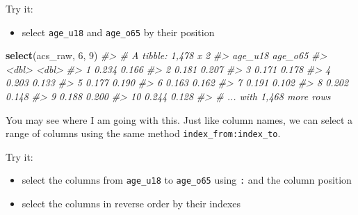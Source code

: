 \documentclass[
]{book}
\newenvironment{Shaded}{\begin{snugshade}}{\end{snugshade}}
\newcommand{\CommentTok}[1]{\textcolor[rgb]{0.56,0.35,0.01}{\textit{#1}}}
\newcommand{\DecValTok}[1]{\textcolor[rgb]{0.00,0.00,0.81}{#1}}
\newcommand{\KeywordTok}[1]{\textcolor[rgb]{0.13,0.29,0.53}{\textbf{#1}}}
\newcommand{\NormalTok}[1]{#1}
\providecommand{\tightlist}{%
  \setlength{\itemsep}{0pt}\setlength{\parskip}{0pt}}
\begin{document}
Try it:

\begin{itemize}
\tightlist
\item
  select \texttt{age\_u18} and \texttt{age\_o65} by their position
\end{itemize}

\begin{Shaded}
\begin{Highlighting}[]
\KeywordTok{select}\NormalTok{(acs\_raw, }\DecValTok{6}\NormalTok{, }\DecValTok{9}\NormalTok{)}
\CommentTok{\#\textgreater{} \# A tibble: 1,478 x 2}
\CommentTok{\#\textgreater{}    age\_u18 age\_o65}
\CommentTok{\#\textgreater{}      \textless{}dbl\textgreater{}   \textless{}dbl\textgreater{}}
\CommentTok{\#\textgreater{}  1   0.234   0.166}
\CommentTok{\#\textgreater{}  2   0.181   0.207}
\CommentTok{\#\textgreater{}  3   0.171   0.178}
\CommentTok{\#\textgreater{}  4   0.203   0.133}
\CommentTok{\#\textgreater{}  5   0.177   0.190}
\CommentTok{\#\textgreater{}  6   0.163   0.162}
\CommentTok{\#\textgreater{}  7   0.191   0.102}
\CommentTok{\#\textgreater{}  8   0.202   0.148}
\CommentTok{\#\textgreater{}  9   0.188   0.200}
\CommentTok{\#\textgreater{} 10   0.244   0.128}
\CommentTok{\#\textgreater{} \# ... with 1,468 more rows}
\end{Highlighting}
\end{Shaded}

You may see where I am going with this. Just like column names, we can select a range of columns using the same method \texttt{index\_from:index\_to}.

Try it:

\begin{itemize}
\tightlist
\item
  select the columns from \texttt{age\_u18} to \texttt{age\_o65} using \texttt{:} and the column position
\item
  select the columns in reverse order by their indexes
\end{itemize}
\end{document}
